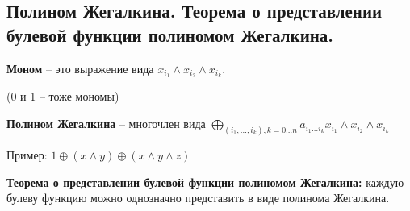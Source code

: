 \subsection{Полином Жегалкина. Теорема о представлении булевой функции полиномом Жегалкина.}

\textbf{Моном} -- это выражение вида $x_{i_1} \wedge x_{i_2} \wedge x_{i_k}$.

(0 и 1 -- тоже мономы)

\textbf{Полином Жегалкина} -- многочлен вида $\bigoplus\limits_{(i_1,\ldots,i_k), k = 0 \ldots n} a_{i_1\ldots i_k}x_{i_1} \wedge x_{i_2} \wedge x_{i_k}$

Пример: $1 \oplus (x \wedge y) \oplus (x \wedge y \wedge z)$

\textbf{Теорема о представлении булевой функции полиномом Жегалкина:} каждую булеву функцию можно однозначно представить в виде полинома Жегалкина.
